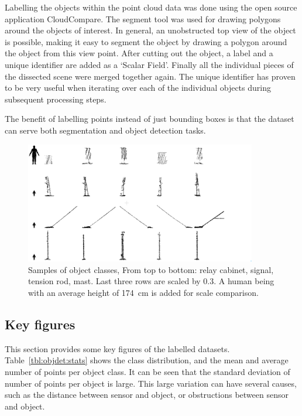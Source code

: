 Labelling the objects within the point cloud data was done using the open source application CloudCompare. The segment tool was used for drawing polygons around the objects of interest. In general, an unobstructed top view of the object is possible, making it easy to segment the object by drawing a polygon around the object from this view point. After cutting out the object, a label and a unique identifier are added as a `Scalar Field'. Finally all the individual pieces of the dissected scene were merged together again. The unique identifier has proven to be very useful when iterating over each of the individual objects during subsequent processing steps.

The benefit of labelling points instead of just bounding boxes is that the dataset can serve both segmentation and object detection tasks.%

\begin{figure}[ht]
    \includegraphics[width=0.9\textwidth]{Chapters/objdet/figures/density_classes2.png}
    \caption{Samples of object classes, From top to bottom: relay cabinet, signal, tension rod, mast. Last three rows are scaled by 0.3. A human being with an average height of 174~cm is added for scale comparison.}
    \label{fig:objdet:classes}
\end{figure}

\subsection{Key figures}
This section provides some key figures of the labelled datasets. Table~\ref{tbl:objdet:stats} shows the class distribution, and the mean and average number of points per object class. It can be seen that the standard deviation of number of points per object is large. This large variation can have several causes, such as the distance between sensor and object, or obstructions between sensor and object.

